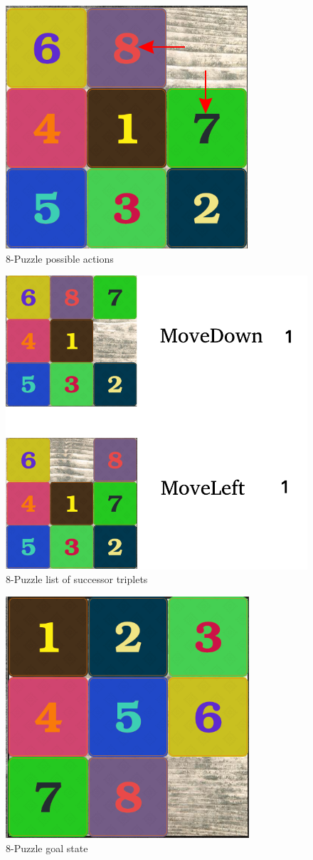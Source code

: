 \documentclass{beamer}
\begin{document}
\begin{frame}
	\begin{figure}
	\centering
		\includegraphics[width=0.5\linewidth]{puzzle8_arrows.png}
		\caption{8-Puzzle possible actions}
	\end{figure}
\end{frame}

\begin{frame}
	\begin{figure}
	\centering
		\includegraphics[width=0.5\linewidth]{puzzle8_successors.png}
		\caption{8-Puzzle list of successor triplets}
	\end{figure}
\end{frame}

\begin{frame}
	\begin{figure}
	\centering
		\includegraphics[width=0.5\linewidth]{puzzle8_goal.png}
		\caption{8-Puzzle goal state}
	\end{figure}
\end{frame}
\end{document}
